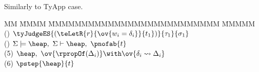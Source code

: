 \begin{flushleft}
\bigskip

Similarly to TyApp case.

\bigskip
\bigskip
\begin{tabbing}
MM \= MMMM \= MMMMMMMMMMMMMMMMMMMMMMMMMM \= MMMMM  \kill
\>	() \> $\tyJudgeES{(\teLetR{r}{\ov{w_i = \delta_i}}{t_1})}
				{\tau_1}
				{\sigma_1}$
		\> 
\\[1ex]
\>	() 	
		\> $\Sigma \models \heap, \ \Sigma \vdash \heap, \ \pnofab{t}$
		\>  
\\[1ex]
\>	(5) 	\> $\heap, \ \ov{\rpropOf(\Delta_i)} 
				\with \ov{\delta_i \leadsto \Delta_i}$
		\>  
\\[1ex]
\>	(6) 	\> $\pstep{\heap}{t}$
		\> 
\end{tabbing}



\end{flushleft}
